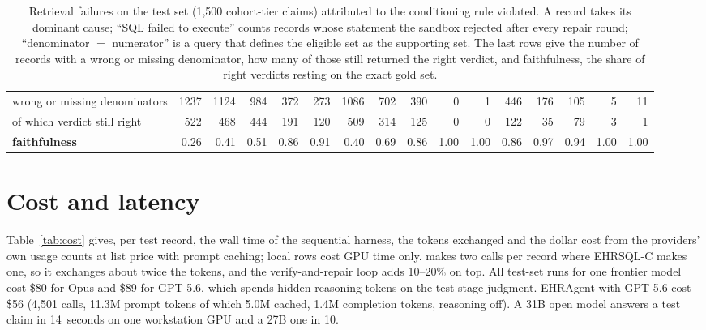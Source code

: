 \begin{table}[tp]
\begin{tabular}{@{}lrrrrrrrrrrrrrrr@{}}
\midrule
wrong or missing denominators & 1237 & 1124 & 984 & 372 & 273 & 1086 & 702 & 390 & 0 & 1 & 446 & 176 & 105 & 5 & 11 \\
\quad of which verdict still right & 522 & 468 & 444 & 191 & 120 & 509 & 314 & 125 & 0 & 0 & 122 & 35 & 79 & 3 & 1 \\
\textbf{faithfulness} & 0.26 & 0.41 & 0.51 & 0.86 & 0.91 & 0.40 & 0.69 & 0.86 & 1.00 & 1.00 & 0.86 & 0.97 & 0.94 & 1.00 & 1.00 \\
\bottomrule
\end{tabular}
\caption{Retrieval failures on the test set (1{,}500 cohort-tier claims)
attributed to the conditioning rule violated. A record takes its dominant
cause; ``SQL failed to execute'' counts records whose statement the sandbox
rejected after every repair round; ``denominator $=$ numerator'' is a query
that defines the eligible set as the supporting set. The last rows give the
number of records with a wrong or missing denominator, how many of those still
returned the right verdict, and faithfulness, the share of right verdicts
resting on the exact gold set.}
\label{tab:attribution}
\end{table}

\section{Cost and latency}
\label{app:cost}

Table~\ref{tab:cost} gives, per test record, the wall time of the sequential
harness, the tokens exchanged and the dollar cost from the providers' own
usage counts at list price with prompt caching; local rows cost GPU time only.
\art{} makes two calls per record where EHRSQL-C makes one, so it exchanges
about twice the tokens, and the verify-and-repair loop adds 10--20\% on top.
All test-set runs for one frontier model cost \$80 for Opus and \$89 for
GPT-5.6, which spends hidden reasoning tokens on the test-stage judgment.
EHRAgent with GPT-5.6 cost \$56 (4{,}501 calls, 11.3M prompt tokens of which
5.0M cached, 1.4M completion tokens, reasoning off). A 31B open model answers
a test claim in 14~seconds on one workstation GPU and a 27B one in 10.


